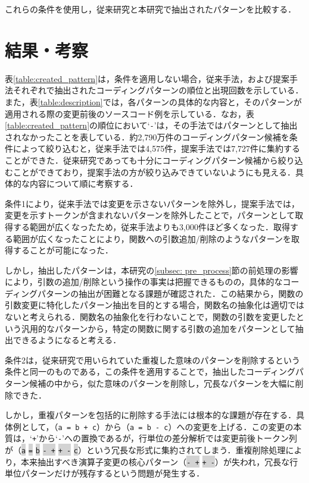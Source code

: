 \documentclass[11pt]{jreport}
\begin{document}
これらの条件を使用し，従来研究と本研究で抽出されたパターンを比較する．

\section{結果・考察}
表\ref{table:created_pattern}は，条件を適用しない場合，従来手法，および提案手法それぞれで抽出されたコーディングパターンの順位と出現回数を示している．また，表\ref{table:description}では，各パターンの具体的な内容と，そのパターンが適用される際の変更前後のソースコード例を示している．なお，表\ref{table:created_pattern}の順位において`\texttt{-}'は，その手法ではパターンとして抽出されなかったことを表している．約2,790万件のコーディングパターン候補を条件によって絞り込むと，従来手法では4,575件，提案手法では7,727件に集約することができた．従来研究であっても十分にコーディングパターン候補から絞り込むことができており，提案手法の方が絞り込みできていないようにも見える．具体的な内容について順に考察する．

条件1により，従来手法では変更を示さないパターンを除外し，提案手法では，変更を示すトークンが含まれないパターンを除外したことで，パターンとして取得する範囲が広くなったため，従来手法よりも3,000件ほど多くなった．取得する範囲が広くなったことにより，関数への引数追加/削除のようなパターンを取得することが可能になった．

しかし，抽出したパターンは，本研究の\ref{subsec: pre_process}節の前処理の影響により，引数の追加/削除という操作の事実は把握できるものの，具体的なコーディングパターンの抽出が困難となる課題が確認された．この結果から，関数の引数変更に特化したパターン抽出を目的とする場合，関数名の抽象化は適切ではないと考えられる．関数名の抽象化を行わないことで，関数の引数を変更したという汎用的なパターンから，特定の関数に関する引数の追加をパターンとして抽出できるようになると考える．

条件2は，従来研究で用いられていた重複した意味のパターンを削除するという条件と同一のものである，この条件を適用することで，抽出したコーディングパターン候補の中から，似た意味のパターンを削除し，冗長なパターンを大幅に削除できた．

しかし，重複パターンを包括的に削除する手法には根本的な課題が存在する．具体例として，（\texttt{a = b + c}）から（\texttt{a = b - c}）への変更を上げる．この変更の本質は，`\texttt{+}'から`\texttt{-}'への置換であるが，行単位の差分解析では変更前後トークン列が（\colorbox{lightgray}{\texttt{a}} \colorbox{lightgray}{\texttt{=}} \colorbox{lightgray}{\texttt{b}} \colorbox{lightgray}{\texttt{- +}} \colorbox{lightgray}{\texttt{+ -}} \colorbox{lightgray}{\texttt{c}}）という冗長な形式に集約されてしまう．重複削除処理により，本来抽出すべき演算子変更の核心パターン（\colorbox{lightgray}{\texttt{- +}} \colorbox{lightgray}{\texttt{+ -}}）が失われ，冗長な行単位パターンだけが残存するという問題が発生する．
\end{document}
